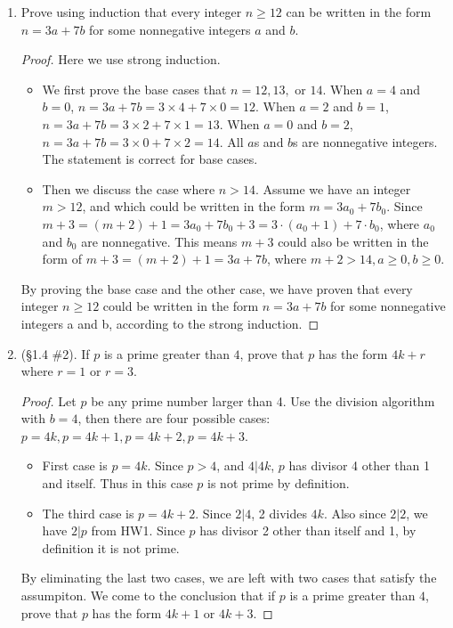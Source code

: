 \documentclass[11pt,a4paper]{article}
\begin{document}
\begin{enumerate}
	\item Prove using induction that every integer \( n \ge 12\) can be written in the form \(n = 3a+7b\) for some nonnegative integers \(a\) and \(b\).

	\begin{proof} Here we use strong induction.
		\begin{itemize}
			\item We first prove the base cases that $n=12, 13,$ or $14$. When $a=4$ and $b=0$, $n=3a+7b=3 \times 4 + 7 \times 0 = 12$. When $a=2$ and $b=1$, $n=3a+7b=3 \times 2 + 7 \times 1 = 13$. When $a=0$ and $b=2$, $n=3a+7b=3 \times 0 + 7 \times 2 = 14$. All $a$s and $b$s are nonnegative integers. The statement is correct for base cases.
			\item Then we discuss the case where $n>14$. Assume we have an integer $m>12$, and which could be written in the form $m=3a_0+7b_0$. Since $m+3 = (m+2)+1 = 3a_0+7b_0+3 = 3\cdot (a_0+1) + 7 \cdot b_0$, where $a_0$ and $b_0$ are nonnegative. This means $m+3$ could also be written in the form of $m+3 = (m+2)+1 = 3a+7b$, where $m+2>14, a\ge 0, b\ge 0$.
		\end{itemize}
				By proving the base case and the other case, we have proven that every integer $n \ge 12$ could be written in the form $n = 3a + 7b$ for some nonnegative integers a and b, according to the strong induction.
	\end{proof}

	\item (\S 1.4 \#2). If \(p\) is a prime greater than \(4\), prove that \(p\) has the form \(4k+r\) where \(r = 1\) or \(r = 3\).

	\begin{proof} Let $p$ be any prime number larger than 4. Use the division algorithm with $b=4$, then there are four possible cases: $p = 4k, p = 4k+1, p = 4k+2, p=4k+3$.
		\begin{itemize}
			\item First case is $p=4k$. Since $p > 4$, and $4|4k$, $p$ has divisor 4 other than 1 and itself. Thus in this case $p$ is not prime by definition.
			\item The third case is $p=4k+2$. Since $2|4$, 2 divides $4k$. Also since $2|2$, we have $2|p$ from HW1. Since $p$ has divisor 2 other than itself and 1, by definition it is not prime.
		\end{itemize}
		By eliminating the last two cases, we are left with two cases that satisfy the assumpiton. We come to the conclusion that if \(p\) is a prime greater than \(4\), prove that \(p\) has the form \(4k+1\) or \(4k+3\).
	\end{proof}


\end{enumerate}
\end{document}
